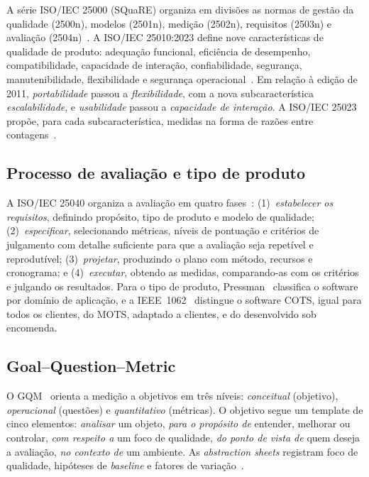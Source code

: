 \documentclass[12pt]{article}
\begin{document}
A série ISO/IEC 25000 (SQuaRE) organiza em divisões as normas de gestão da qualidade (2500n), modelos (2501n), medição (2502n), requisitos (2503n) e avaliação (2504n)~\cite{ramos2026aulas}. A ISO/IEC 25010:2023 define nove características de qualidade de produto: adequação funcional, eficiência de desempenho, compatibilidade, capacidade de interação, confiabilidade, segurança, manutenibilidade, flexibilidade e segurança operacional~\cite{iso25010}. Em relação à edição de 2011, \emph{portabilidade} passou a \emph{flexibilidade}, com a nova subcaracterística \emph{escalabilidade}, e \emph{usabilidade} passou a \emph{capacidade de interação}. A ISO/IEC 25023 propõe, para cada subcaracterística, medidas na forma de razões entre contagens~\cite{iso25023}.

\subsection{Processo de avaliação e tipo de produto}

A ISO/IEC 25040 organiza a avaliação em quatro fases~\cite{iso25040,ramos2026aulas}: (1)~\emph{estabelecer os requisitos}, definindo propósito, tipo de produto e modelo de qualidade; (2)~\emph{especificar}, selecionando métricas, níveis de pontuação e critérios de julgamento com detalhe suficiente para que a avaliação seja repetível e reprodutível; (3)~\emph{projetar}, produzindo o plano com método, recursos e cronograma; e (4)~\emph{executar}, obtendo as medidas, comparando-as com os critérios e julgando os resultados. Para o tipo de produto, Pressman~\cite{pressman2002} classifica o software por domínio de aplicação, e a IEEE~1062~\cite{ieee1062} distingue o software COTS, igual para todos os clientes, do MOTS, adaptado a clientes, e do desenvolvido sob encomenda.

\subsection{Goal--Question--Metric}

O GQM~\cite{basili1994gqm} orienta a medição a objetivos em três níveis: \emph{conceitual} (objetivo), \emph{operacional} (questões) e \emph{quantitativo} (métricas). O objetivo segue um template de cinco elementos: \emph{analisar} um objeto, \emph{para o propósito de} entender, melhorar ou controlar, \emph{com respeito a} um foco de qualidade, \emph{do ponto de vista de} quem deseja a avaliação, \emph{no contexto de} um ambiente. As \emph{abstraction sheets} registram foco de qualidade, hipóteses de \textit{baseline} e fatores de variação~\cite{ramos2026aulas}.
\end{document}
